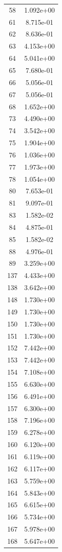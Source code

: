 \documentclass[12pt]{article}
\begin{document}
\begin{longtable}{@{}cc@{}}
58 & 1.092e+00 \\
61 & 8.715e-01 \\
62 & 8.636e-01 \\
63 & 4.153e+00 \\
64 & 5.041e+00 \\
65 & 7.680e-01 \\
66 & 5.056e-01 \\
67 & 5.056e-01 \\
68 & 1.652e+00 \\
73 & 4.490e+00 \\
74 & 3.542e+00 \\
75 & 1.904e+00 \\
76 & 1.036e+00 \\
77 & 1.973e+00 \\
78 & 1.054e+00 \\
80 & 7.653e-01 \\
81 & 9.097e-01 \\
83 & 1.582e-02 \\
84 & 4.875e-01 \\
85 & 1.582e-02 \\
88 & 4.976e-01 \\
89 & 3.259e+00 \\
137 & 4.433e+00 \\
138 & 3.642e+00 \\
148 & 1.730e+00 \\
149 & 1.730e+00 \\
150 & 1.730e+00 \\
151 & 1.730e+00 \\
152 & 7.442e+00 \\
153 & 7.442e+00 \\
154 & 7.108e+00 \\
155 & 6.630e+00 \\
156 & 6.491e+00 \\
157 & 6.300e+00 \\
158 & 7.196e+00 \\
159 & 6.278e+00 \\
160 & 6.120e+00 \\
161 & 6.119e+00 \\
162 & 6.117e+00 \\
163 & 5.759e+00 \\
164 & 5.843e+00 \\
165 & 6.615e+00 \\
166 & 5.734e+00 \\
167 & 5.978e+00 \\
168 & 5.647e+00 \\

\end{longtable}
\end{document}
